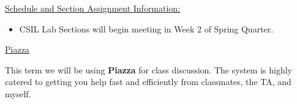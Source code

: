 %  
%  
%
%  
%
\noindent \underline{Schedule and Section Assignment Information:}

  \begin{itemize}

    \item CSIL Lab Sections will begin meeting in Week 2 of Spring Quarter. 

  \end{itemize}
  


\noindent \underline{Piazza}

\noindent This term we will be using \textbf{Piazza} for class discussion. The system is highly catered to getting you help fast and efficiently from classmates, the TA, and myself. 

